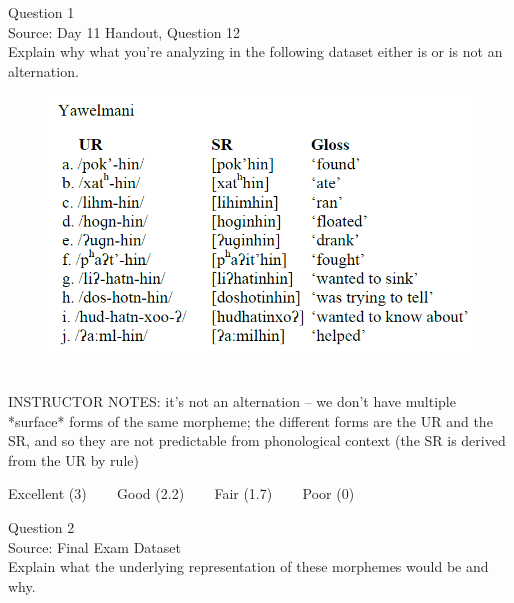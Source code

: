 \documentclass[12pt]{article}
\begin{document}
\begin{center}
\textbf{{\color{blue}{\HUGE START OF EXAM\\}}}

\textbf{{\color{blue}{\HUGE Student ID: 4465\\}}}

\textbf{{\color{blue}{\HUGE 4:00 - 4:20 PM\\}}}

\end{center}
\newpage

{\large Question 1}\\

Source: Day 11 Handout, Question 12\\

Explain why what you’re analyzing in the following dataset either is or is not an alternation.\\

\begin{figure}[H]
\includegraphics{../images/yawelmani.png}
\end{figure}

~\\
INSTRUCTOR NOTES: it's not an alternation -- we don't have multiple *surface* forms of the same morpheme; the different forms are the UR and the SR, and so they are not predictable from phonological context (the SR is derived from the UR by rule)


\vfill
Excellent (3) ~~~ Good (2.2) ~~~ Fair (1.7) ~~~ Poor (0)
\newpage

{\large Question 2}\\

Source: Final Exam Dataset\\

Explain what the underlying representation of these morphemes would be and why.\\
\end{document}
